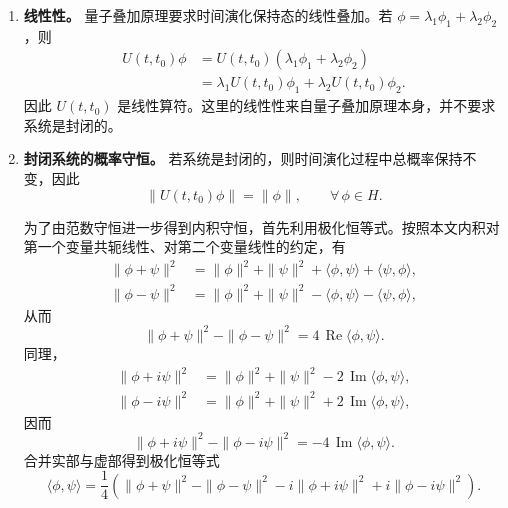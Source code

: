 \documentclass[UTF8,a4paper,11pt,openany]{ctexbook}
\begin{document}
\begin{enumerate}
    \item \textbf{线性性。} 量子叠加原理要求时间演化保持态的线性叠加。若
    $\phi=\lambda_1\phi_1+\lambda_2\phi_2$，则
    \begin{align}
        U(t,t_0)\phi
        &=U(t,t_0)(\lambda_1\phi_1+\lambda_2\phi_2)
        \nonumber\\
        &=\lambda_1U(t,t_0)\phi_1
        +\lambda_2U(t,t_0)\phi_2.
    \end{align}
    因此 $U(t,t_0)$ 是线性算符。这里的线性性来自量子叠加原理本身，并不要求系统是封闭的。

    \item \textbf{封闭系统的概率守恒。} 若系统是封闭的，则时间演化过程中总概率保持不变，因此
    \begin{equation}
        \|U(t,t_0)\phi\|=\|\phi\|,
        \qquad \forall\,\phi\in H.
    \end{equation}

    为了由范数守恒进一步得到内积守恒，首先利用极化恒等式。按照本文内积对第一个变量共轭线性、对第二个变量线性的约定，有
    \begin{align}
        \|\phi+\psi\|^2
        &=
        \|\phi\|^2+\|\psi\|^2
        +\langle\phi,\psi\rangle
        +\langle\psi,\phi\rangle,
        \nonumber\\
        \|\phi-\psi\|^2
        &=
        \|\phi\|^2+\|\psi\|^2
        -\langle\phi,\psi\rangle
        -\langle\psi,\phi\rangle,
    \end{align}
    从而
    \begin{equation}
        \|\phi+\psi\|^2-\|\phi-\psi\|^2
        =
        4\,\operatorname{Re}\langle\phi,\psi\rangle.
    \end{equation}
    同理，
    \begin{align}
        \|\phi+i\psi\|^2
        &=
        \|\phi\|^2+\|\psi\|^2
        -2\,\operatorname{Im}\langle\phi,\psi\rangle,
        \nonumber\\
        \|\phi-i\psi\|^2
        &=
        \|\phi\|^2+\|\psi\|^2
        +2\,\operatorname{Im}\langle\phi,\psi\rangle,
    \end{align}
    因而
    \begin{equation}
        \|\phi+i\psi\|^2-\|\phi-i\psi\|^2
        =
        -4\,\operatorname{Im}\langle\phi,\psi\rangle.
    \end{equation}
    合并实部与虚部得到极化恒等式
    \begin{equation}
        \langle\phi,\psi\rangle
        =
        \frac14
        \left(
            \|\phi+\psi\|^2-\|\phi-\psi\|^2
            -i\|\phi+i\psi\|^2+i\|\phi-i\psi\|^2
        \right).
    \end{equation}


\end{enumerate}
\end{document}
